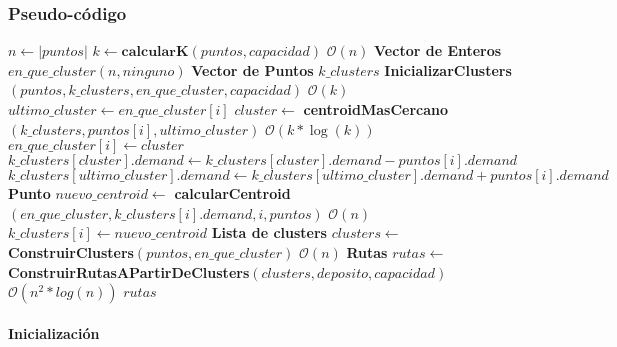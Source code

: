 \subsubsection{Pseudo-código}

\begin{algorithm}[H]
	\caption{\Comment $\mathcal{O}(cant\_it * (n*k*\log(k) + k*n)) = \mathcal{O}(cant\_it *n*k*\log(k))$}
	\begin{algorithmic}[1]
		\State $n \gets |puntos|$
		\State $k \gets \textbf{calcularK}(puntos, capacidad)$ \Comment $\mathcal{O}(n)$
		\Statex
		\State \textbf{Vector de Enteros} $en\_que\_cluster\mathcal{}(n, ninguno)$
		\State \textbf{Vector de Puntos} $k\_clusters$
		\State \textbf{InicializarClusters}$(puntos, k\_clusters, en\_que\_cluster, capacidad)$  \Comment $\mathcal{O}(k)$
		\Statex
		\State $ultimo\_cluster \gets en\_que\_cluster[i]$
		\State $cluster \gets $ \textbf{centroidMasCercano}$(k\_clusters, puntos[i], ultimo\_cluster)$ \Comment $\mathcal{O}(k*\log(k))$
		\State $en\_que\_cluster[i] \gets cluster$
		\State $k\_clusters[cluster].demand \gets k\_clusters[cluster].demand-puntos[i].demand$
		\State $k\_clusters[ultimo\_cluster].demand \gets k\_clusters[ultimo\_cluster].demand + puntos[i].demand$
		\EndIf
		\EndIf
		\EndFor
		\State \textbf{Punto } $nuevo\_centroid \gets $ \textbf{calcularCentroid}$(en\_que\_cluster, k\_clusters[i].demand, i, puntos)$ \Comment $\mathcal{O}(n)$
		\State $k\_clusters[i] \gets nuevo\_centroid$
		\EndIf
		\EndFor
		\EndWhile
		\Statex
		\State 
		\State \textbf{Lista de clusters} $clusters \gets $ \textbf{ConstruirClusters}$(puntos, en\_que\_cluster)$ \Comment $\mathcal{O}(n)$
		\State \textbf{Rutas} $rutas \gets$ \textbf{ConstruirRutasAPartirDeClusters}$(clusters, deposito, capacidad)$ \Comment $\mathcal{O}(n^2*log(n))$
		\Statex
		\State \Return $rutas$
		\EndFunction
	\end{algorithmic}
\end{algorithm}

\paragraph{Inicialización}

